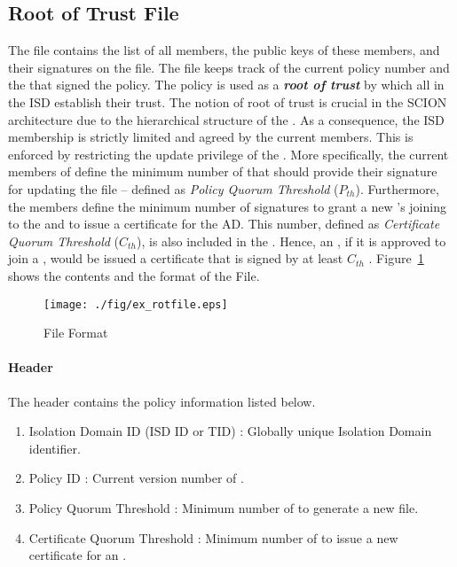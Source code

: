 \subsection{Root of Trust File} \label{subsec:root-of-trust}
The \RT file contains the list of all \ISDCore members, the public keys of these members, and their signatures on the \RT file. The \RT file keeps track of the current policy number and the \ADs that signed the policy. The policy is used as a {\bf \em root of trust} by which all \ADs in the ISD establish their trust. The notion of root of trust is crucial in the SCION architecture due to the hierarchical structure of the \ISD. As a consequence, the ISD membership is strictly limited and agreed by the current members. This is enforced by restricting the update privilege of the \PF. More specifically, the current members of \ISDC define the minimum number of \ADs that should provide their signature for updating the \RT file -- defined as {\em Policy Quorum Threshold} ($P_{th}$). Furthermore, the \ISDC members define the minimum number of \AD signatures to grant a new \AD's joining to the \ISDC and to issue a certificate for the AD. This number, defined as {\em Certificate Quorum Threshold} ($C_{th}$), is also included in the \PF. Hence, an \AD, if it is approved to join a \ISDC, would be issued a certificate that is signed by at least $C_{th}$ \ISDC \ADs. Figure~\ref{fig:rot-file} shows the contents and the format of the \RT File. 

\begin{figure}[h]
\centering
\texttt{[image: ./fig/ex\_rotfile.eps]}
\caption{\RT File Format}\label{fig:rot-file}
\end{figure}

\paragraph{Header}
The header contains the \ISDC policy information listed below. 

\begin{enumerate}
\item Isolation Domain ID (ISD ID or TID) : Globally unique Isolation Domain identifier.
\item Policy ID : Current version number of \PF.
\item Policy Quorum Threshold : Minimum number of \ISDC \ADs to generate a new \RT file. 
\item Certificate Quorum Threshold : Minimum number of \ISDC \ADs to issue a new certificate for an \AD.
\end{enumerate}

